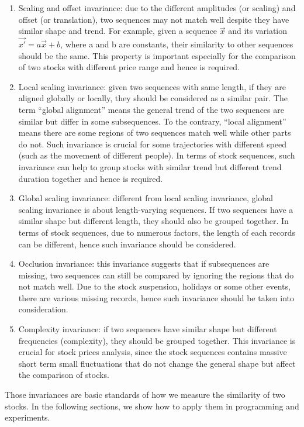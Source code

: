 \begin{enumerate}
    \item Scaling and offset invariance: due to the different amplitudes (or scaling) and offset (or translation), two sequences may not match well despite they have similar shape and trend. For example, given a sequence $\vec{x}$ and its variation $\vec{x\prime} = a\vec{x} + b$, where a and b are constants, their similarity to other sequences should be the same. This property is important especially for the comparison of two stocks with different price range and hence is required. 
    \item Local scaling invariance: given two sequences with same length, if they are aligned globally or locally, they should be considered as a similar pair. The term ``global alignment'' means the general trend of the two sequences are similar but differ in some subsequences. To the contrary, ``local alignment'' means there are some regions of two sequences match well while other parts do not. Such invariance is crucial for some trajectories with different speed (such as the movement of different people). In terms of stock sequences, such invariance can help to group stocks with similar trend but different trend duration together and hence is required.
    \item Global scaling invariance: different from local scaling invariance, global scaling invariance is about length-varying sequences. If two sequences have a similar shape but different length, they should also be grouped together. In terms of stock sequences, due to numerous factors, the length of each records can be different, hence such invariance should be considered.
    \item Occlusion invariance: this invariance suggests that if subsequences are missing, two sequences can still be compared by ignoring the regions that do not match well. Due to the stock suspension, holidays or some other events, there are various missing records, hence such invariance should be taken into consideration.
    \item Complexity invariance: if two sequences have similar shape but different frequencies (complexity), they should be grouped together. This invariance is crucial for stock prices analysis, since the stock sequences contains massive short term small fluctuations that do not change the general shape but affect the comparison of stocks.
\end{enumerate}
Those invariances are basic standards of how we measure the similarity of two stocks. In the following sections, we show how to apply them in programming and experiments.

